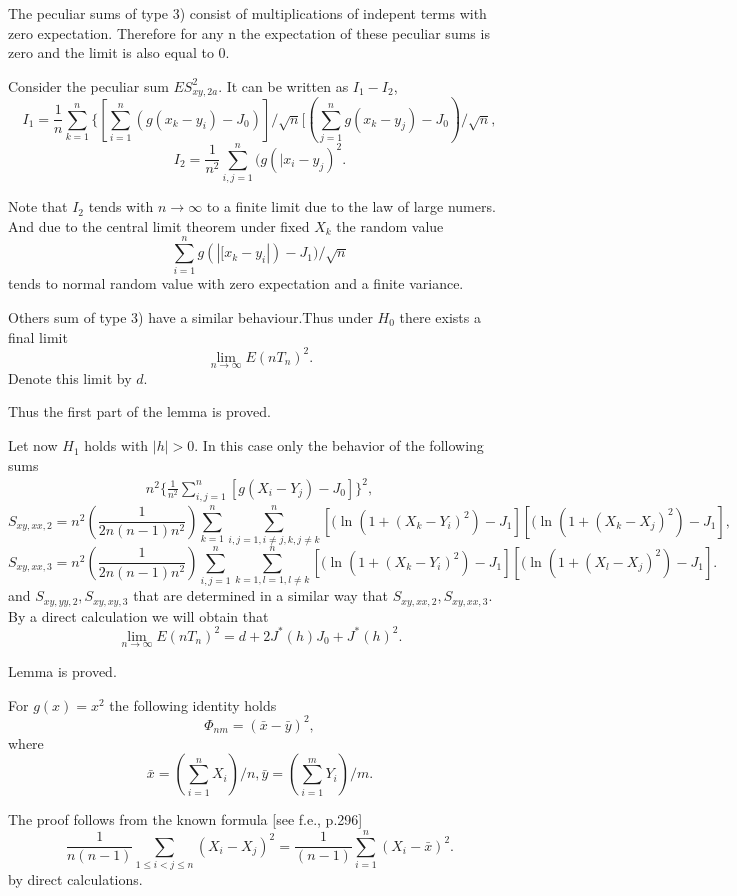 \documentclass{svproc}
\begin{document}
The peculiar sums of type 3) consist of multiplications of indepent terms with zero expectation. Therefore for any n the expectation of these peculiar sums is zero and the limit is also equal to 0.

Consider the peculiar sum $ES^2_{xy,2a}.$  It can be written as $I_1 - I_2$,
$$
I_1=\frac{1}{n}\sum_{k=1}^n \{[\sum_{i=1}^n
(g(x_k-y_i)-J_0)]/\sqrt{n}[(\sum_{j=1}^n
g(x_k-y_j)-J_0)/\sqrt{n},
$$
$$
I_2= \frac {1}{n^2}\sum_{i,j=1}^n(g(|x_i-y_j)^2.
$$

Note that $I_2$ tends with $n \to \infty$ to a finite limit due to the law of large numers. And
due to the central limit theorem
under fixed  $X_k$ the random value
$$
\sum_{i=1}^n
g(|[x_k-y_i|)-J_1)/\sqrt{n}
$$
tends to normal random value with zero expectation and a finite variance.

Others sum of type 3) have a similar behaviour.Thus under $H_0$  there exists a final limit
$$
\lim_{n \to \infty}E(nT_n)^2.
$$
Denote this limit by $d$.

Thus the first part of the lemma is proved.

Let now $H_1$ holds with
$|h|>0$. In this case only the behavior of the following sums
\begin{eqnarray*}
n^2 \{\frac{1}{n^2}\sum_{i,j=1}^n [g(X_i - Y_j)-J_0]\}^2,
\end{eqnarray*}
$$
S_{xy,xx,2}=n^2 (\frac{1}{2n(n-1)n^2})\sum_{k=1}^n \sum_{i,j=1, i\ne j,k, j\ne k}^n[(\ln(1 + (X_k - Y_i)^2)-J_1][(\ln(1 + (X_k - X_j)^2)-J_1],
$$
$$
S_{xy,xx,3}=n^2 (\frac{1}{2n(n-1)n^2})\sum_{i,j=1}^n\sum_{k=1,l=1,l \ne k}^n [(\ln(1 + (X_k - Y_i)^2)-J_1][(\ln(1 + (X_l - X_j)^2)-J_1].
$$
and $S_{xy,yy,2},S_{xy,xy,3}$ that are determined in a similar way that  $S_{xy,xx,2},S_{xy,xx,3}$.
By a direct calculation we will obtain that
$$
\lim_{n \to \infty}E(nT_n)^2=
d + 2J^*(h)J_0 + J^*(h)^2.
$$

Lemma is proved.

\begin{lemma} For $g(x)= x^2$ the following identity holds
$$
\Phi_{nm}= (\bar x - \bar y)^2,
$$
where
$$
\bar x = (\sum_{i=1}^n X_i)/n,
\bar y = (\sum_{i=1}^m Y_i)/m.
$$
\end{lemma}

The proof follows from the known formula [see f.e.\cite{Hoeffding}, p.296]
$$
\frac {1}{n(n-1)}\sum_{1\leq i<j\leq n
} (X_i-X_j)^2=\frac {1}{(n-1)} \sum_{i=1}^n (X_i - \bar x)^2.
$$
by  direct calculations.
\end{document}
